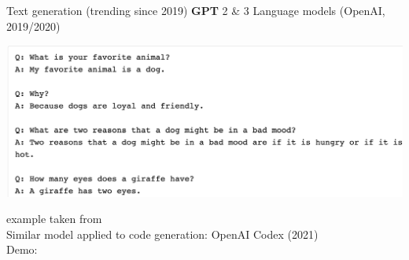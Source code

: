 \begin{frame}{Text generation (trending since 2019)}
\textbf{GPT} 2 \& 3 Language models (OpenAI, 2019/2020)
\begin{center}
    \includegraphics[height=0.6\textheight]{figures/applications/gpt_ex2.png}
\end{center}
{\small example taken from }\\
Similar model applied to code generation: OpenAI Codex (2021) \\
Demo: 

\end{frame}


